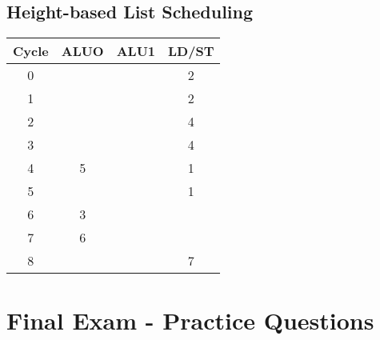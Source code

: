 \documentclass{report}
\begin{document}
\section{Height-based List Scheduling}
\begin{tabular}{|c|c|c|c|}
  \hline
  Cycle & ALUO & ALU1 & LD/ST \\
  \hline
  0     &      &      & 2     \\
  \hline
  1     &      &      & 2     \\
  \hline
  2     &      &      & 4     \\
  \hline
  3     &      &      & 4     \\
  \hline
  4     & 5    &      & 1     \\
  \hline
  5     &      &      & 1     \\
  \hline
  6     & 3    &      &       \\
  \hline
  7     & 6    &      &       \\
  \hline
  8     &      &      & 7     \\
  \hline
\end{tabular}


\renewcommand\thechapter{E2}
\chapter{Final Exam - Practice Questions}
\end{document}
